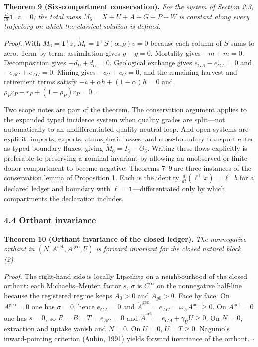 \documentclass[11pt]{article}
\begin{document}
\textbf{Theorem 9 (Six-compartment conservation).} \emph{For the system
of Section 2.3, \(\frac{d}{dt}\mathbf{1}^\top z = 0\); the total mass
\(M_6 = X + U + A + G + P + W\) is constant along every trajectory on
which the classical solution is defined.}

\emph{Proof.} With \(M_6 = \mathbf{1}^\top z\), \(\dot M_6 = \mathbf{1}^\top S(\alpha,\rho) v = 0\) because each column of \(S\) sums to zero. Term by term: assimilation gives \(g - g = 0\). Mortality gives \(-m + m = 0\). Decomposition gives \(-d_U + d_U = 0\). Geological exchange gives \(e_{GA} - e_{GA} = 0\) and \(-e_{AG} + e_{AG} = 0\). Mining gives \(-c_G + c_G = 0\), and the remaining harvest and retirement terms satisfy \(-h + \alpha h + (1-\alpha)h = 0\) and \(\rho_P r_P - r_P + (1-\rho_P)r_P = 0\). \ensuremath{\square}

Two scope notes are part of the theorem. The conservation argument applies to the expanded typed incidence system when quality grades are split---not automatically to an undifferentiated quality-neutral loop. And open systems are explicit: imports, exports, atmospheric losses, and cross-boundary transport enter as typed boundary fluxes, giving \(\dot M_6 = I_{\partial} - O_{\partial}\). Writing these flows explicitly is preferable to preserving a nominal invariant by allowing an unobserved or finite donor compartment to become negative. Theorems 7--9 are three instances of the conservation lemma of Proposition 1. Each is the identity \(\frac{d}{dt}(\ell^\top x) = \ell^\top b\) for a declared ledger and boundary with \(\ell = \mathbf{1}\)---differentiated only by which compartments the declaration includes.

\subsubsection{4.4 Orthant invariance}\label{orthant-invariance}

\textbf{Theorem 10 (Orthant invariance of the closed ledger).} \emph{The
nonnegative orthant in \((N, A^{\mathrm{act}}, A^{\mathrm{geo}}, U)\) is
forward invariant for the closed natural block (2).}

\emph{Proof.} The right-hand side is locally Lipschitz on a
neighbourhood of the closed orthant: each Michaelis--Menten factor
\(s\), \(\sigma\) is \(C^\infty\) on the nonnegative half-line because
the registered regime keeps \(A_0 > 0\) and \(A_{g0} > 0\). Face by
face. On \(A^{\mathrm{geo}} = 0\) one has \(\sigma = 0\), hence
\(e_{GA} = 0\) and
\(\dot A^{\mathrm{geo}} = e_{AG} = \omega_A A^{\mathrm{act}} \ge 0\). On
\(A^{\mathrm{act}} = 0\) one has \(s = 0\), so
\(R = B = T = e_{AG} = 0\) and
\(\dot A^{\mathrm{act}} = e_{GA} + \gamma_U U \ge 0\). On \(N = 0\),
extraction and uptake vanish and \(\dot N = 0\). On \(U = 0\),
\(\dot U = T \ge 0\). Nagumo's inward-pointing criterion (Aubin, 1991)
yields forward invariance of the orthant. \ensuremath{\square}
\end{document}
